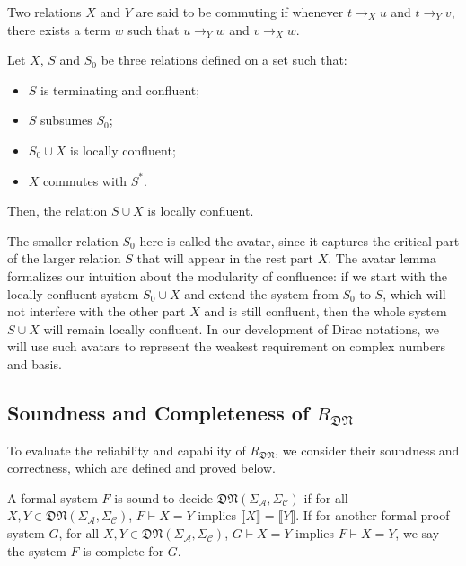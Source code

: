 \documentclass[manuscript, review, timestamp]{acmart}
\newcommand*{\sem}[1]{\llbracket #1 \rrbracket}
\begin{document}
\begin{definition}
  Two relations $X$ and $Y$ are said to be commuting if whenever $t \to_X u$ and $t \to_Y v$, there exists a term $w$ such that $u \to_Y w$ and $v \to_X w$.
\end{definition}

\begin{lemma} \cite{Arrighi2005} Let $X$, $S$ and $S_0$ be three relations defined on a set such that:
  \begin{itemize}
    \item $S$ is terminating and confluent;
    \item $S$ subsumes $S_0$;
    \item $S_0 \cup X$ is locally confluent;
    \item $X$ commutes with $S^*$.
  \end{itemize}
  Then, the relation $S \cup X$ is locally confluent.
\end{lemma}

The smaller relation $S_0$ here is called the avatar, since it captures the critical part of the larger relation $S$ that will appear in the rest part $X$. The avatar lemma formalizes our intuition about the modularity of confluence: if we start with the locally confluent system $S_0 \cup X$ and extend the system from $S_0$ to $S$, which will not interfere with the other part $X$ and is still confluent, then the whole system $S\cup X$ will remain locally confluent. In our development of Dirac notations, we will use such avatars to represent the weakest requirement on complex numbers and basis.



\subsection{Soundness and Completeness of $R_\mathfrak{DN}$}

To evaluate the reliability and capability of $R_\mathfrak{DN}$, we consider their soundness and correctness, which are defined and proved below.

\begin{definition}
  A formal system $F$ is sound to decide $\mathfrak{DN}(\Sigma_\mathcal{A}, \Sigma_\mathcal{C})$ if for all $X, Y \in \mathfrak{DN}(\Sigma_\mathcal{A}, \Sigma_\mathcal{C})$, $F \vdash X = Y$ implies $\sem{X} = \sem{Y}$. If for another formal proof system $G$, for all $X, Y \in \mathfrak{DN}(\Sigma_\mathcal{A}, \Sigma_\mathcal{C})$, $G \vdash X = Y$ implies $F \vdash X = Y$, we say the system $F$ is complete for $G$.
\end{definition}
\end{document}
